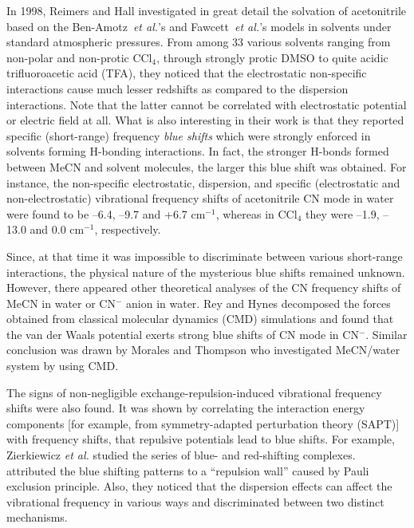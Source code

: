 \documentclass[a4paper,titlepage,twoside,fleqn,12pt]{book}
\begin{document}
\begin{refsection}
In 1998, Reimers and Hall \citep{Reimers.Hall.JACS.1999} investigated in great detail the solvation of acetonitrile 
based on the Ben-Amotz~\emph{et al.}'s and Fawcett~\emph{et al.}'s models in solvents under standard atmospheric pressures. 
From among 33 various solvents ranging from non\hyp{}polar and non\hyp{}protic CCl$_4$, 
through strongly protic
DMSO to quite acidic trifluoroacetic acid (TFA), they noticed that the electrostatic
non\hyp{}specific interactions cause much lesser redshifts as compared to the dispersion
interactions. Note that the latter cannot be correlated with electrostatic potential
or electric field at all. What is also interesting in their work is that they 
reported specific (short\hyp{}range) frequency \emph{blue shifts} which were strongly enforced
in solvents forming H-bonding interactions. In fact, the stronger H-bonds formed between MeCN
and solvent molecules, the larger this blue shift was obtained. For instance,
the non\hyp{}specific electrostatic, dispersion, and specific (electrostatic
and non\hyp{}electrostatic) vibrational frequency shifts of acetonitrile CN mode
in water were found to be --6.4, --9.7 and +6.7 cm$^{-1}$, whereas in CCl$_4$ they were
--1.9, --13.0 and 0.0 cm$^{-1}$, respectively.

Since, at that time it was impossible to discriminate between various short\hyp{}range
interactions, the physical nature of the mysterious blue shifts remained unknown.
However, there appeared other theoretical analyses of the CN frequency shifts of MeCN in water
or CN$^-$ anion in water. Rey and Hynes \citep{Rey.Hynes.JCP.1998} decomposed the forces obtained from classical molecular dynamics
(CMD) simulations and found that the van der Waals potential exerts strong blue shifts of CN mode in CN$^-$.
Similar conclusion was drawn by Morales and Thompson who investigated MeCN/water system by 
using CMD. \citep{Morales.Thompson.JPCB.2011}

The signs of non\hyp{}negligible exchange\hyp{}repulsion\hyp{}induced vibrational 
frequency shifts \newline were also  
found. \citep{Li.Liu.Schlegel.JACS.2002,Delanoye.Herrebout.vanderVeken.JACS.2002,Zierkiewicz.Jurecka.Hobza.ChemPhysChem.2005,
Rodziewicz.Rutkowski.Melikova.Koll.ChemPhysChem.2005,
Zhou.Qiu.JPCA.2009,Mo.Wang.Guan.Braida.Hiberty.Wu.ChemEurJ.2014}
It was shown by correlating the interaction
energy components [for example, from symmetry\hyp{}adapted 
perturbation theory \citep{Jeziorski.Moszynski.Szalewicz.ChemRev.1994} (SAPT)] with frequency shifts, that repulsive potentials
lead to blue shifts. For example, Zierkiewicz \emph{et al.} studied the series of 
blue\hyp{} and red\hyp{}shifting complexes. \citep{Zierkiewicz.Jurecka.Hobza.ChemPhysChem.2005} 
attributed the
blue shifting patterns to a ``repulsion wall'' caused by Pauli exclusion principle. 
Also, they noticed that
the dispersion effects can affect the vibrational frequency in various ways
and discriminated between two distinct mechanisms.


\end{refsection}
\end{document}
